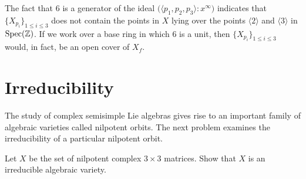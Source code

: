 The fact that $6$ is a generator of the ideal $\big( \langle p_{1},
p_{2}, p_{3} \rangle : x^{\infty} \big)$ indicates that
$\{X_{p_{i}}\}_{1 \leq i \leq 3}$ does not contain the points in $X$
lying over the points $\langle 2 \rangle$ and $\langle 3 \rangle$ in
$\operatorname{Spec}({\mathbb Z})$.  If we work over a base ring in which $6$ is a unit,
then $\{X_{p_{i}}\}_{1 \leq i \leq 3}$ would, in fact, be an open
cover of $X_{f}$.


\section{Irreducibility}

The study of complex semisimple Lie algebras gives rise to an
important family of algebraic varieties called nilpotent
orbits.  The next problem examines the
irreducibility of a particular nilpotent
orbit.

\begin{problem*} 
Let $X$ be the set of nilpotent complex $3 \times 3$ matrices.  Show
that $X$ is an irreducible algebraic variety.
\end{problem*}

